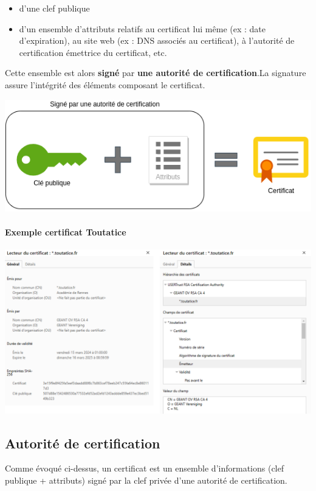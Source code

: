 \documentclass[french, 12pt]{article}%
\newcommand{\itemE}{\item[$\bullet$]}
\begin{document}
\begin{itemize}
\itemE d'une clef publique
\itemE d'un ensemble d'attributs relatifs au certificat lui même (ex : date d'expiration), au site web (ex : DNS associés au certificat), à l'autorité de certification émettrice du certificat, etc.
\end{itemize}

Cette ensemble est alors \textbf{signé} par \textbf{une autorité de certification}.La signature assure l’intégrité des éléments composant le certificat.

\begin{center}
\includegraphics[scale=0.7]{./ressource/certifcatDessin}
\end{center}

\paragraph{Exemple certificat Toutatice}
\begin{center}
\includegraphics[scale=0.5]{./ressource/certifcatToutatice.png}
\end{center}

\subsection{Autorité de certification}
Comme évoqué ci-dessus, un certificat est un ensemble d’informations (clef publique + attributs) signé par la clef privée d’une autorité de certification.
\end{document}
